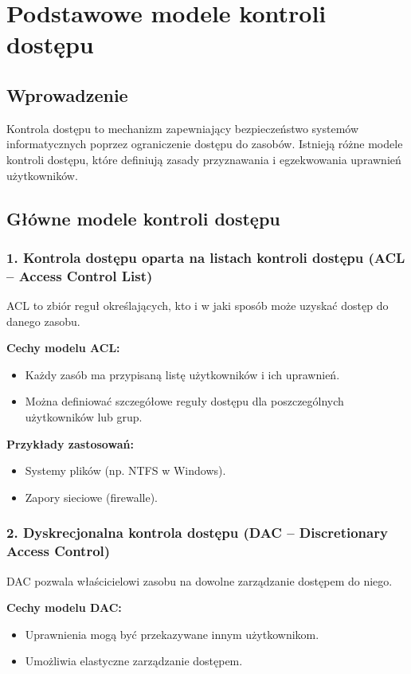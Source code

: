 \section{Podstawowe modele kontroli dostępu}

\subsection{Wprowadzenie}
Kontrola dostępu to mechanizm zapewniający bezpieczeństwo systemów informatycznych poprzez ograniczenie dostępu do zasobów. Istnieją różne modele kontroli dostępu, które definiują zasady przyznawania i egzekwowania uprawnień użytkowników.

\subsection{Główne modele kontroli dostępu}

\subsubsection{1. Kontrola dostępu oparta na listach kontroli dostępu (ACL – Access Control List)}
ACL to zbiór reguł określających, kto i w jaki sposób może uzyskać dostęp do danego zasobu.

\textbf{Cechy modelu ACL:}
\begin{itemize}
    \item Każdy zasób ma przypisaną listę użytkowników i ich uprawnień.
    \item Można definiować szczegółowe reguły dostępu dla poszczególnych użytkowników lub grup.
\end{itemize}

\textbf{Przykłady zastosowań:}
\begin{itemize}
    \item Systemy plików (np. NTFS w Windows).
    \item Zapory sieciowe (firewalle).
\end{itemize}

\subsubsection{2. Dyskrecjonalna kontrola dostępu (DAC – Discretionary Access Control)}
DAC pozwala właścicielowi zasobu na dowolne zarządzanie dostępem do niego.

\textbf{Cechy modelu DAC:}
\begin{itemize}
    \item Uprawnienia mogą być przekazywane innym użytkownikom.
    \item Umożliwia elastyczne zarządzanie dostępem.
\end{itemize}

